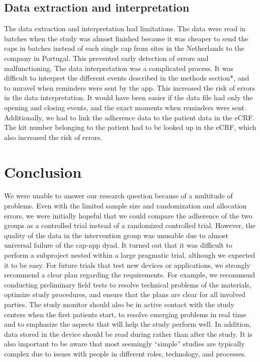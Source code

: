 \documentclass[twocolumn, issue, empirical, authordate]{jote-new-article}
\begin{document}
\subsection{Data extraction and interpretation}

 The data extraction and interpretation had limitations. The data were read in batches when the study was almost finished because it was cheaper to send the caps in batches instead of each single cap from sites in the Netherlands to the company in Portugal. This prevented early detection of errors and malfunctioning.
 The data interpretation was a complicated process. It was difficult to interpret the different events described in the methods section*, and to unravel when reminders were sent by the app. This increased the risk of errors in the data interpretation. It would have been easier if the data file had only the opening and closing events, and the exact moments when reminders were sent. Additionally, we had to link the adherence data to the patient data in the eCRF. The kit number belonging to the patient had to be looked up in the eCRF, which also increased the risk of errors.


\section{Conclusion}

 We were unable to answer our research question because of a multitude of problems. Even with the limited sample size and randomization and allocation errors, we were initially hopeful that we could compare the adherence of the two groups as a controlled trial instead of a randomized controlled trial. However, the quality of the data in the intervention group was unusable due to almost universal failure of the cap-app dyad. It turned out that it was difficult to perform a subproject nested within a large pragmatic trial, although we expected it to be easy.
 For future trials that test new devices or applications, we strongly recommend a clear plan regarding the requirements. For example, we recommend conducting preliminary field tests to resolve technical problems of the materials, optimize study procedures, and ensure that the plans are clear for all involved parties. The study monitor should also be in active contact with the study centers when the first patients start, to resolve emerging problems in real time and to emphasize the aspects that will help the study perform well. In addition, data stored in the device should be read during rather than after the study. It is also important to be aware that most seemingly ``simple'' studies are typically complex due to issues with people in different roles, technology, and processes.
\end{document}
